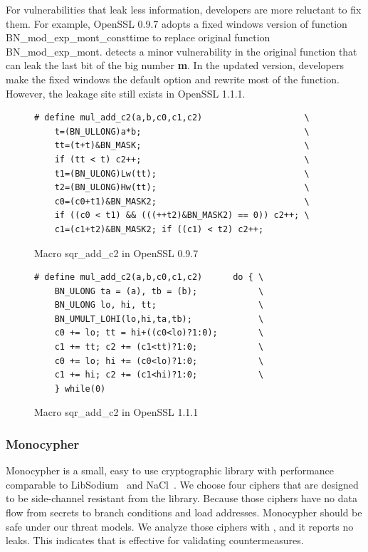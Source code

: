 For vulnerabilities that leak less information,
developers are more reluctant to fix them. 
For example, OpenSSL 0.9.7 adopts a fixed windows version of 
function \textsf{BN\_mod\_exp\_mont\_consttime} to replace original function
\textsf{BN\_mod\_exp\_mont}.
\tool{} detects a minor vulnerability in the original function that can
leak the last bit of the big number \textbf{m}. In the updated version,
developers make the fixed windows the default option and rewrite most of the 
function. However, the leakage site still exists in OpenSSL 1.1.1.
\begin{figure}
    \centering
    \begin{lstlisting}[xleftmargin=.02\textwidth,xrightmargin=.01\textwidth]
# define mul_add_c2(a,b,c0,c1,c2)                    \
    t=(BN_ULLONG)a*b;                                \
    tt=(t+t)&BN_MASK;                                \
    if (tt < t) c2++;                                \
    t1=(BN_ULONG)Lw(tt);                             \
    t2=(BN_ULONG)Hw(tt);                             \
    c0=(c0+t1)&BN_MASK2;                             \
    if ((c0 < t1) && (((++t2)&BN_MASK2) == 0)) c2++; \
    c1=(c1+t2)&BN_MASK2; if ((c1) < t2) c2++;
\end{lstlisting}
    \vspace*{-6pt}
    \caption{Macro \textsf{sqr\_add\_c2} in OpenSSL 0.9.7}
    \label{fig:old_sqr2}
    \vspace*{-8pt}
\end{figure}


\begin{figure}
    \centering
    \begin{lstlisting}[xleftmargin=.02\textwidth,xrightmargin=.01\textwidth]
# define mul_add_c2(a,b,c0,c1,c2)      do { \
    BN_ULONG ta = (a), tb = (b);            \
    BN_ULONG lo, hi, tt;                    \
    BN_UMULT_LOHI(lo,hi,ta,tb);             \
    c0 += lo; tt = hi+((c0<lo)?1:0);        \
    c1 += tt; c2 += (c1<tt)?1:0;            \
    c0 += lo; hi += (c0<lo)?1:0;            \
    c1 += hi; c2 += (c1<hi)?1:0;            \
    } while(0)
\end{lstlisting}
    \vspace*{-6pt}
    \caption{Macro \textsf{sqr\_add\_c2} in OpenSSL 1.1.1}
    \label{fig:new_sqr2}
    \vspace*{-10pt}
\end{figure}


\subsubsection{Monocypher}\label{eval:mono}
Monocypher is a small, easy to use cryptographic library with
performance comparable to LibSodium~\cite{libsodium} and NaCl~\cite{bernstein2012security}. 
We choose four ciphers that are 
designed to be side-channel resistant from the library.
Because those ciphers have no 
data flow from secrets to branch conditions and load addresses.
Monocypher should be safe under our threat models. 
We analyze those ciphers with \tool{}, and it reports no leaks.
This indicates that \tool{} is effective for validating countermeasures.
